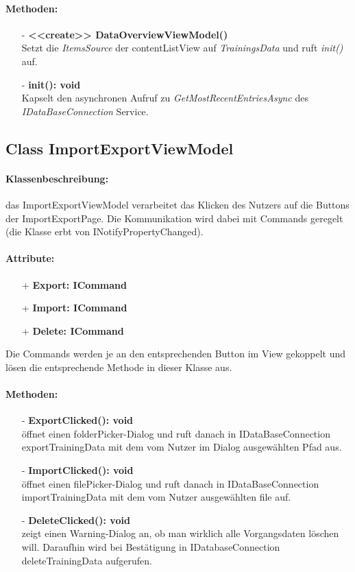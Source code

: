 \documentclass[a4paper,12pt]{article}
\begin{document}
\paragraph{Methoden:}
\begin{itemize}
    \item[-] \textbf{<<create>> DataOverviewViewModel()} \\ Setzt die \textit{ItemsSource} der contentListView auf \textit{TrainingsData} und ruft \textit{init()} auf.
    \item[-] \textbf{init(): void} \\ Kapselt den asynchronen Aufruf zu \textit{GetMostRecentEntriesAsync} des \textit{IDataBaseConnection} Service.
\end{itemize} 

\subsection{Class ImportExportViewModel}

\paragraph{Klassenbeschreibung:}
das ImportExportViewModel verarbeitet das Klicken des Nutzers auf die Buttons  der ImportExportPage.
Die Kommunikation wird dabei mit Commands geregelt (die Klasse erbt von INotifyPropertyChanged).
\paragraph{Attribute:}
\begin{itemize}
	\item[+] \textbf{Export: ICommand}
	\item[+] \textbf{Import: ICommand}
	\item[+] \textbf{Delete: ICommand}
\end{itemize}
Die Commands werden je an den entsprechenden Button im View gekoppelt und lösen die entsprechende Methode in dieser Klasse aus.
\paragraph{Methoden:}
\begin{itemize}
    \item[-] \textbf{ExportClicked(): void}\\ öffnet einen folderPicker-Dialog und ruft danach in IDataBaseConnection exportTrainingData mit dem vom Nutzer im Dialog ausgewählten Pfad aus.%
    \item[-] \textbf{ImportClicked(): void}\\ öffnet einen filePicker-Dialog und ruft danach in IDataBaseConnection importTrainingData mit dem vom Nutzer ausgewählten file auf.
    \item[-] \textbf{DeleteClicked(): void}\\zeigt einen Warning-Dialog an, ob man wirklich alle Vorgangsdaten löschen will. Daraufhin wird bei Bestätigung in IDatabaseConnection deleteTrainingData aufgerufen.
\end{itemize} 
\end{document}
